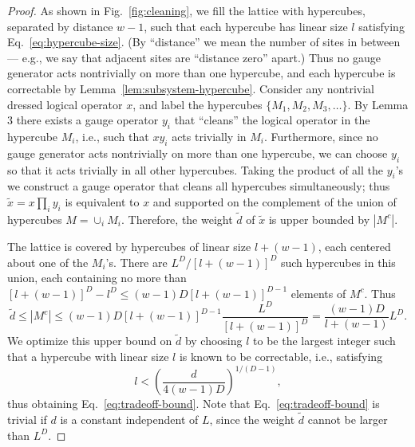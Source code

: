 \begin{proof}
As shown in Fig.~\ref{fig:cleaning}, we fill the lattice with hypercubes, separated by distance $w-1$, 
such that each hypercube has linear size $l$ satisfying Eq.~\eqref{eq:hypercube-size}. 
(By ``distance'' we mean the number of sites in between --- e.g., we say that adjacent sites are ``distance zero'' apart.)
Thus no gauge generator acts nontrivially on more than one hypercube, 
and each hypercube is correctable by Lemma~\ref{lem:subsystem-hypercube}. 
Consider any nontrivial dressed logical operator $x$, 
and label the hypercubes $\{M_1, M_2, M_3, \dots\}$. 
By Lemma 3 there exists a gauge operator $y_i$ that ``cleans'' the logical operator in the hypercube $M_i$, 
i.e., such that $xy_i$ acts trivially in $M_i$. 
Furthermore, since no gauge generator acts nontrivially on more than one hypercube, 
we can choose $y_i$ so that it acts trivially in all other hypercubes. 
Taking the product of all the $y_i$'s we construct 
a gauge operator that cleans all hypercubes simultaneously; 
thus $\tilde x= x\prod_i y_i$ is equivalent to $x$ and supported on the complement of the union of hypercubes $M=\cup_i M_i$. 
Therefore, the weight $\tilde d$ of $\tilde x$ is upper bounded by $|M^c|$. 

The lattice is covered by hypercubes of linear size $l+(w-1)$, 
each centered about one of the $M_i$'s. 
There are $L^D/\left[l+(w-1)\right]^D$ such hypercubes in this union, 
each containing no more than $\left[l+(w-1)\right]^D - l^D \le (w-1)D\left[l+(w-1)\right]^{D-1}$ elements of $M^c$. 
Thus 
\[
\tilde d \le |M^c| 
\le (w-1)D\left[l+(w-1)\right]^{D-1}\frac{L^D}{\left[l+(w-1)\right]^D} 
= \frac{(w-1)D}{l+(w-1)}L^D.
\]
We optimize this upper bound on $\tilde d$ by choosing $l$ to be the largest integer 
such that a hypercube with linear size $l$ is known to be correctable,  
i.e., satisfying
\[
l < \left(\frac{d}{4(w-1)D}\right)^{1/(D-1)},
\]
thus obtaining Eq.~\eqref{eq:tradeoff-bound}.
Note that Eq.~\eqref{eq:tradeoff-bound} is trivial 
if $d$ is a constant independent of $L$, 
since the weight $\tilde d$ cannot be larger than $L^D$.
\end{proof}
